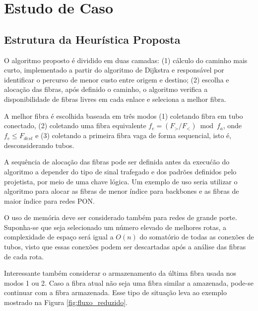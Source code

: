 \section{Estudo de Caso} \label{sec:algorithm}

%
\subsection{Estrutura da Heurística Proposta}

O algoritmo proposto é dividido em duas camadas: (1) cálculo do caminho mais
curto, implementado a partir do algoritmo de Dijkstra e responsável por
identificar o percurso de menor custo entre origem e destino; (2) escolha e
alocação das fibras, após definido o caminho, o algoritmo verifica a
disponibilidade de fibras livres em cada enlace e seleciona a melhor fibra.

A melhor fibra é escolhida baseada em três modos (1) coletando fibra em tubo
conectado, (2) coletando uma fibra equivalente $f_e = (F_{>} / {F_{<}}) \bmod
  f_{a}$, onde $f_{e} \leq F_{dest}$ e (3) coletando a primeira
  fibra vaga de forma sequencial, isto é, desconsiderando tubos.

A sequência de alocação das fibras pode ser definida antes da execućão do
algoritmo a depender do tipo de sinal trafegado e dos padrões definidos pelo
projetista, por meio de uma chave lógica. Um exemplo de uso seria utilizar o
algoritmo para alocar as fibras de menor índice para backbones e as fibras de
maior índice para redes PON.

O uso de memória deve ser considerado também para redes de grande porte.
Suponha-se que seja selecionado um número elevado de melhores rotas, a
complexidade de espaço será igual a $O(n)$ do somatório de todas as conexões
de tubos, visto que essas conexões podem ser descartadas após a análise das fibras
de cada rota.

Interessante também considerar o armazenamento da última fibra usada nos modos
1 ou 2. Caso a fibra atual não seja uma fibra similar a amazenada, pode-se continuar
com a fibra armazenada. Esse tipo de situação leva ao exemplo mostrado na Figura
\ref{fig:fluxo_reduzido}.

